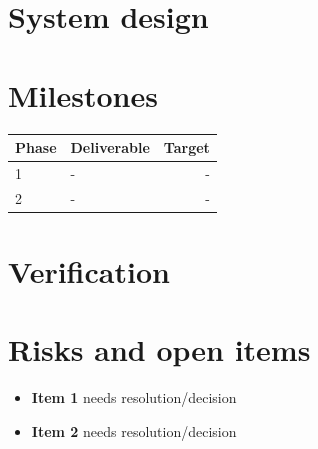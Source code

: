 \documentclass[11pt,letterpaper]{article}
\begin{document}
	\section{System design}
	
	
	
	
	\section{Milestones}
	
	\begin{tabularx}{\textwidth}{@{}l X r@{}}
		\toprule
		\textsf{\small Phase} & \textsf{\small Deliverable} & \textsf{\small Target} \\
		\midrule
		1 & - & - \\
		2 & - & - \\
		\bottomrule
	\end{tabularx}
	
	\section{Verification}
	
	
	\section{Risks and open items}
	
	\begin{itemize}
		\item \textbf{Item 1} needs resolution/decision
		\item \textbf{Item 2} needs resolution/decision
	\end{itemize}
	
\end{document}
